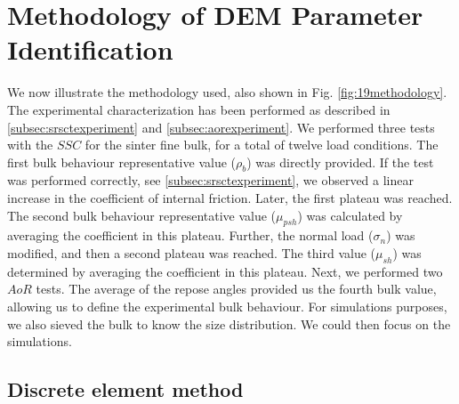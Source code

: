 \section{Methodology of DEM Parameter Identification}
\label{sec:methodology}

We now illustrate the methodology used, also shown in Fig.
\ref{fig:19methodology}.
The experimental characterization has been performed as described in
\ref{subsec:srsctexperiment} and \ref{subsec:aorexperiment}. We performed
three tests with the $SSC$ for the sinter fine bulk, for a total of twelve
load conditions. 
The first bulk behaviour representative value ($\rho_b$) was directly provided. 
If the test was performed correctly, see \ref{subsec:srsctexperiment}, we
observed a linear increase in the coefficient of internal friction.
Later, the first plateau was reached. 
The second bulk behaviour representative value ($\mu_{psh}$) was calculated by averaging the coefficient in this plateau. 
Further, the normal load ($\sigma_n$) was modified, and then a second plateau
was reached.
The third value ($\mu_{sh}$) was determined by averaging the coefficient in this plateau. 
Next, we performed two $AoR$ tests. 
The average of the repose angles provided us the fourth bulk value, allowing us
to define the experimental bulk behaviour.
For simulations purposes, we also sieved the bulk to know the size distribution.
We could then focus on the simulations. 

\subsection{Discrete element method}
\label{subsec:dem}

